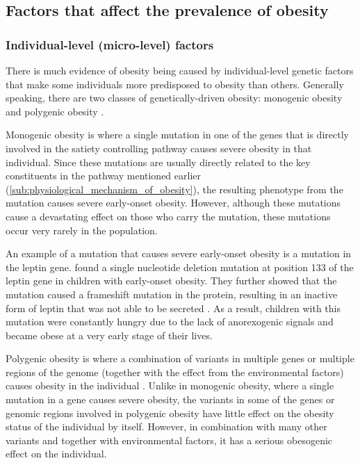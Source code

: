 \subsection{Factors that affect the prevalence of obesity}
\label{sub:factors_that_affect_the_prevalence_of_obesity}

\subsubsection{Individual-level (micro-level) factors}
\label{ssub:Individual-level_(micro-level)_factors}

There is much evidence of obesity being caused by individual-level genetic factors that make some individuals more predisposed to obesity than others.
Generally speaking, there are two classes of genetically-driven obesity: monogenic obesity and polygenic obesity \citep{Moustafa2013}.

Monogenic obesity is where a single mutation in one of the genes that is directly involved in the satiety controlling pathway causes severe obesity in that individual.
Since these mutations are usually directly related to the key constituents in the pathway mentioned earlier (\cref{sub:physiological_mechanism_of_obesity}), the resulting phenotype from the mutation causes severe early-onset obesity.
However, although these mutations cause a devastating effect on those who carry the mutation, these mutations occur very rarely in the population.

An example of a mutation that causes severe early-onset obesity is a mutation in the leptin gene.
\citet{Montague1997} found a single nucleotide deletion mutation at position 133 of the leptin gene in children with early-onset obesity.
They further showed that the mutation caused a frameshift mutation in the protein, resulting in an inactive form of leptin that was not able to be secreted \citep{Montague1997}.
As a result, children with this mutation were constantly hungry due to the lack of anorexogenic signals and became obese at a very early stage of their lives.

Polygenic obesity is where a combination of variants in multiple genes or multiple regions of the genome (together with the effect from the environmental factors) causes obesity in the individual \citep{Moustafa2013}.
Unlike in monogenic obesity, where a single mutation in a gene causes severe obesity, the variants in some of the genes or genomic regions involved in polygenic obesity have little effect on the obesity status of the individual by itself.
However, in combination with many other variants and together with environmental factors, it has a serious obesogenic effect on the individual.

